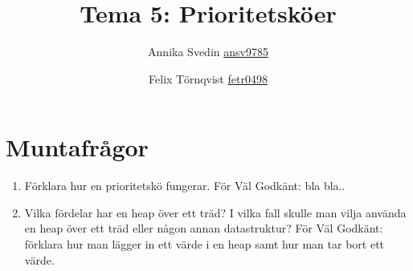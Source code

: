 \documentclass[a5paper,10pt,oneside]{article}
\title{Tema 5: Prioritetsköer}
\author{Annika Svedin \url{ansv9785} \and Felix Törnqvist \url{fetr0498}}
\begin{document}
\maketitle

\section*{Muntafrågor}

\begin{enumerate}
	\item Förklara hur en prioritetskö fungerar. För Väl Godkänt: bla bla..
	
	\item Vilka fördelar har en heap över ett träd? I vilka fall skulle man vilja använda en heap över ett träd eller någon annan datastruktur? För Väl Godkänt: förklara hur man lägger in ett värde i en heap samt hur man tar bort ett värde.
\end{enumerate}
\end{document}
